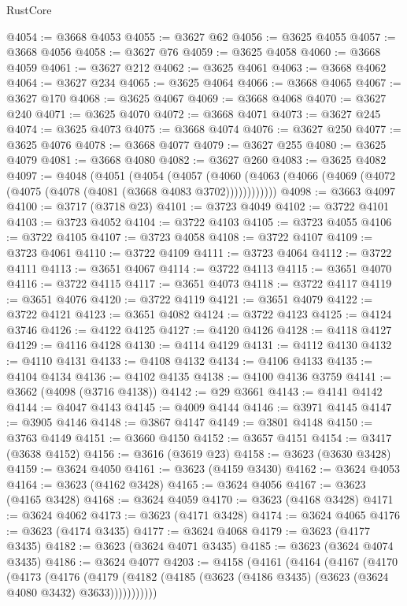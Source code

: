 \begin{lexlean}{RustCore}
\begin{coremodule}
@4054 := @3668 @4053
@4055 := @3627 @62
@4056 := @3625 @4055
@4057 := @3668 @4056
@4058 := @3627 @76
@4059 := @3625 @4058
@4060 := @3668 @4059
@4061 := @3627 @212
@4062 := @3625 @4061
@4063 := @3668 @4062
@4064 := @3627 @234
@4065 := @3625 @4064
@4066 := @3668 @4065
@4067 := @3627 @170
@4068 := @3625 @4067
@4069 := @3668 @4068
@4070 := @3627 @240
@4071 := @3625 @4070
@4072 := @3668 @4071
@4073 := @3627 @245
@4074 := @3625 @4073
@4075 := @3668 @4074
@4076 := @3627 @250
@4077 := @3625 @4076
@4078 := @3668 @4077
@4079 := @3627 @255
@4080 := @3625 @4079
@4081 := @3668 @4080
@4082 := @3627 @260
@4083 := @3625 @4082
@4097 := @4048
    (@4051
      (@4054
        (@4057
          (@4060 (@4063 (@4066 (@4069 (@4072 (@4075 (@4078 (@4081 (@3668 @4083 @3702))))))))))))
@4098 := @3663 @4097
@4100 := @3717 (@3718 @23)
@4101 := @3723 @4049
@4102 := @3722 @4101
@4103 := @3723 @4052
@4104 := @3722 @4103
@4105 := @3723 @4055
@4106 := @3722 @4105
@4107 := @3723 @4058
@4108 := @3722 @4107
@4109 := @3723 @4061
@4110 := @3722 @4109
@4111 := @3723 @4064
@4112 := @3722 @4111
@4113 := @3651 @4067
@4114 := @3722 @4113
@4115 := @3651 @4070
@4116 := @3722 @4115
@4117 := @3651 @4073
@4118 := @3722 @4117
@4119 := @3651 @4076
@4120 := @3722 @4119
@4121 := @3651 @4079
@4122 := @3722 @4121
@4123 := @3651 @4082
@4124 := @3722 @4123
@4125 := @4124 @3746
@4126 := @4122 @4125
@4127 := @4120 @4126
@4128 := @4118 @4127
@4129 := @4116 @4128
@4130 := @4114 @4129
@4131 := @4112 @4130
@4132 := @4110 @4131
@4133 := @4108 @4132
@4134 := @4106 @4133
@4135 := @4104 @4134
@4136 := @4102 @4135
@4138 := @4100 @4136 @3759
@4141 := @3662 (@4098 (@3716 @4138))
@4142 := @29 @3661
@4143 := @4141 @4142
@4144 := @4047 @4143
@4145 := @4009 @4144
@4146 := @3971 @4145
@4147 := @3905 @4146
@4148 := @3867 @4147
@4149 := @3801 @4148
@4150 := @3763 @4149
@4151 := @3660 @4150
@4152 := @3657 @4151
@4154 := @3417 (@3638 @4152)
@4156 := @3616 (@3619 @23)
@4158 := @3623 (@3630 @3428)
@4159 := @3624 @4050
@4161 := @3623 (@4159 @3430)
@4162 := @3624 @4053
@4164 := @3623 (@4162 @3428)
@4165 := @3624 @4056
@4167 := @3623 (@4165 @3428)
@4168 := @3624 @4059
@4170 := @3623 (@4168 @3428)
@4171 := @3624 @4062
@4173 := @3623 (@4171 @3428)
@4174 := @3624 @4065
@4176 := @3623 (@4174 @3435)
@4177 := @3624 @4068
@4179 := @3623 (@4177 @3435)
@4182 := @3623 (@3624 @4071 @3435)
@4185 := @3623 (@3624 @4074 @3435)
@4186 := @3624 @4077
@4203 := @4158
    (@4161
      (@4164
        (@4167
          (@4170
            (@4173
              (@4176
                (@4179
                  (@4182 (@4185 (@3623 (@4186 @3435) (@3623 (@3624 @4080 @3432) @3633)))))))))))

\end{coremodule}
\end{lexlean}

